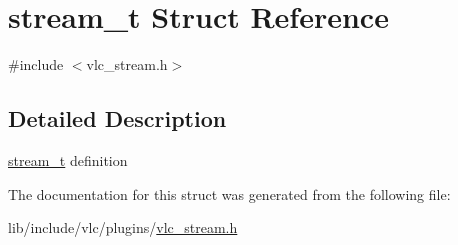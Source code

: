 \hypertarget{structstream__t}{}\section{stream\+\_\+t Struct Reference}
\label{structstream__t}


{\ttfamily \#include $<$vlc\+\_\+stream.\+h$>$}



\subsection{Detailed Description}
\hyperlink{structstream__t}{stream\+\_\+t} definition 

The documentation for this struct was generated from the following file\+:\begin{DoxyCompactItemize}
\item 
lib/include/vlc/plugins/\hyperlink{vlc__stream_8h}{vlc\+\_\+stream.\+h}\end{DoxyCompactItemize}
